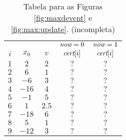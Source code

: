 \begin{table}
    \begin{tabular}{|c|c|c|c|c|}
        \hline
            & & & $\textit{now} = 0$ & $\textit{now} = 1$ \\
        $i$ & $x_0$ & $v$ & $\textit{cert}[i]$ & $\textit{cert}[i]$ \\
        \hline
        $1$ & $2$ & $2$ & $?$ & $?$ \\

        $2$ & $6$ & $1$ & $?$ & $?$ \\

        $3$ & $-6$ & $3$ & $?$ & $?$ \\

        $4$ & $-16$ & $4$ & $?$ & $?$ \\

        $5$ & $-1$ & $5$ & $?$ & $?$ \\

        $6$ & $1$ & $2.5$ & $?$ & $?$ \\

        $7$ & $-18$ & $6$ & $?$ & $?$ \\

        $8$ & $5$ & $1$ & $?$ & $?$ \\

        $9$ & $-12$ & $3$ & $?$ & $?$ \\
        \hline
    \end{tabular}
    \caption{Tabela para as Figuras \ref{fig:maxdevent} e
    \ref{fig:max:update}. (incompleta)}
\end{table}